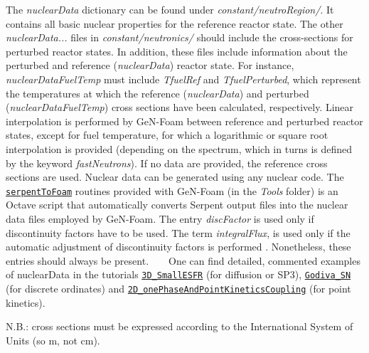 The {\itshape nuclear\+Data} dictionary can be found under {\itshape constant/neutro\+Region/}. It contains all basic nuclear properties for the reference reactor state. The other {\itshape nuclear\+Data...} files in {\itshape constant/neutronics/} should include the cross-\/sections for perturbed reactor states. In addition, these files include information about the perturbed and reference ({\itshape nuclear\+Data}) reactor state. For instance, {\itshape nuclear\+Data\+Fuel\+Temp} must include {\itshape Tfuel\+Ref} and {\itshape Tfuel\+Perturbed}, which represent the temperatures at which the reference ({\itshape nuclear\+Data}) and perturbed ({\itshape nuclear\+Data\+Fuel\+Temp}) cross sections have been calculated, respectively. Linear interpolation is performed by Ge\+N-\/\+Foam between reference and perturbed reactor states, except for fuel temperature, for which a logarithmic or square root interpolation is provided (depending on the spectrum, which in turns is defined by the keyword {\itshape fast\+Neutrons}). If no data are provided, the reference cross sections are used. Nuclear data can be generated using any nuclear code. The \href{https://gitlab.com/foam-for-nuclear/GeN-Foam/-/tree/master/Tools/serpentToFoam/serpent2.1.23}{\tt serpent\+To\+Foam} routines provided with Ge\+N-\/\+Foam (in the {\itshape Tools} folder) is an Octave script that automatically converts Serpent output files into the nuclear data files employed by Ge\+N-\/\+Foam. The entry {\itshape disc\+Factor} is used only if discontinuity factors have to be used. The term {\itshape integral\+Flux}, is used only if the automatic adjustment of discontinuity factors is performed \cite{FIORINA2016212}. Nonetheless, these entries should always be present. ~\newline
~\newline
One can find detailed, commented examples of nuclear\+Data in the tutorials \href{https://gitlab.com/foam-for-nuclear/GeN-Foam/-/tree/master/Tutorials/3D_SmallESFR/rootCase/constant/neutroRegion/nuclearData}{\tt 3\+D\+\_\+\+Small\+E\+S\+FR} (for diffusion or S\+P3), \href{https://gitlab.com/foam-for-nuclear/GeN-Foam/-/tree/master/Tutorials/Godiva_SN/constant/neutroRegion/nuclearData}{\tt Godiva\+\_\+\+SN} (for discrete ordinates) and \href{https://gitlab.com/foam-for-nuclear/GeN-Foam/-/tree/master/Tutorials/2D_onePhaseAndPointKineticsCoupling/rootCase/constant/neutroRegion/nuclearData}{\tt 2\+D\+\_\+one\+Phase\+And\+Point\+Kinetics\+Coupling} (for point kinetics).

N.\+B.\+: cross sections must be expressed according to the International System of Units (so m, not cm).

